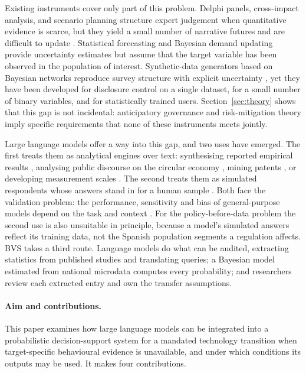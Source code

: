 Existing instruments cover only part of this problem. Delphi panels,
cross-impact analysis, and scenario planning structure expert judgement when
quantitative evidence is scarce, but they yield a small number of narrative
futures and are difficult to update \citep{bas2015}. Statistical forecasting
and Bayesian demand updating \citep{lee2012} provide uncertainty estimates but
assume that the target variable has been observed in the population of
interest. Synthetic-data generators based on Bayesian networks reproduce survey
structure with explicit uncertainty \citep{pearl1988,kjaerulff2008,martins2024},
yet they have been developed for disclosure control on a single dataset, for a
small number of binary variables, and for statistically trained users.
Section~\ref{sec:theory} shows that this gap is not incidental: anticipatory
governance and risk-mitigation theory imply specific requirements that none of
these instruments meets jointly.

Large language models offer a way into this gap, and two uses have emerged.
The first treats them as analytical engines over text: synthesising reported
empirical results \citep{guo2026}, analysing public discourse on the circular
economy \citep{li2026}, mining patents \citep{park2026}, or developing
measurement scales \citep{hoffmann2024}. The second treats them as simulated
respondents whose answers stand in for a human sample \citep{argyle2023}. Both
face the validation problem: the performance, sensitivity and bias of
general-purpose models depend on the task and context
\citep{hajikhani2024}. For the policy-before-data problem the second use is
also unsuitable in principle, because a model's simulated answers reflect its
training data, not the Spanish population segments a regulation affects. BVS
takes a third route. Language models do what can be audited, extracting
statistics from published studies and translating queries; a Bayesian model
estimated from national microdata computes every probability; and researchers
review each extracted entry and own the transfer assumptions.

\paragraph{Aim and contributions.}
This paper examines how large language models can be integrated into a
probabilistic decision-support system for a mandated technology transition
when target-specific behavioural evidence is unavailable, and under which
conditions its outputs may be used. It makes four contributions.

